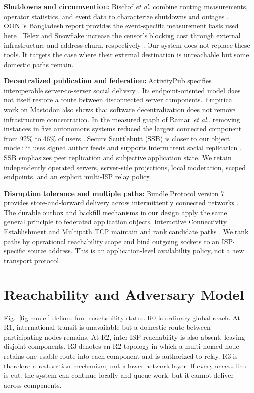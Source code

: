 \documentclass[conference,a4paper]{IEEEtran}
\begin{document}
\textbf{Shutdowns and circumvention:} Bischof \emph{et al.} combine routing measurements, operator
statistics, and event data to characterize shutdowns and outages \cite{bischof2023shutdowns}. OONI's
Bangladesh report provides the event-specific measurement basis used here
\cite{ooni2025bangladesh}. Telex and Snowflake increase the censor's blocking cost through external
infrastructure and address churn, respectively \cite{wustrow2011telex,bocovich2024snowflake}. Our
system does not replace these tools. It targets the case where their external destination is
unreachable but some domestic paths remain.

\textbf{Decentralized publication and federation:} ActivityPub specifies interoperable
server-to-server social delivery \cite{activitypub}. Its endpoint-oriented model does not itself
restore a route between disconnected server components. Empirical work on Mastodon also shows that
software decentralization does not remove infrastructure concentration. In the measured graph of
Raman \emph{et al.}, removing instances in five autonomous systems reduced the largest connected
component from 92\% to 46\% of users \cite{raman2019mastodon}. Secure Scuttlebutt (SSB) is closer to
our object model: it uses signed author feeds and supports intermittent social replication
\cite{tarr2019ssb}. SSB emphasizes peer replication and subjective application state. We retain
independently operated servers, server-side projections, local moderation, scoped endpoints, and an
explicit multi-ISP relay policy.

\textbf{Disruption tolerance and multiple paths:} Bundle Protocol version 7 provides
store-and-forward delivery across intermittently connected networks \cite{rfc9171}. The durable
outbox and backfill mechanisms in our design apply the same general principle to federated
application objects. Interactive Connectivity Establishment and Multipath TCP maintain and rank
candidate paths \cite{rfc8445,rfc8684}. We rank paths by operational reachability scope and bind
outgoing sockets to an ISP-specific source address. This is an application-level availability
policy, not a new transport protocol.

\section{Reachability and Adversary Model}

Fig.~\ref{fig:model} defines four reachability states. R0 is ordinary global reach. At R1,
international transit is unavailable but a domestic route between participating nodes remains. At
R2, inter-ISP reachability is also absent, leaving disjoint components. R3 denotes an R2 topology in
which a multi-homed node retains one usable route into each component and is authorized to relay.
R3 is therefore a restoration mechanism, not a lower network layer. If every access link is cut,
the system can continue locally and queue work, but it cannot deliver across components.
\end{document}
